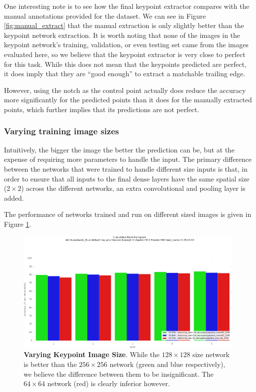 One interesting note is to see how the final keypoint extractor compares with the manual annotations provided for the dataset.
We can see in Figure \ref{fig:manual_extract} that the manual extraction is only slightly better than the keypoint network extraction.
It is worth noting that none of the images in the keypoint network's training, validation, or even testing set came from the images evaluated here, so we believe that the keypoint extractor is very close to perfect for this task.
While this does not mean that the keypoints predicted are perfect, it does imply that they are ``good enough'' to extract a matchable trailing edge.

However, using the notch as the control point actually does reduce the accuracy more significantly for the predicted points than it does for the manually extracted points, which further implies that its predictions are not perfect.

\subsubsection{Varying training image sizes}

Intuitively, the bigger the image the better the prediction can be, but at the expense of requiring more parameters to handle the input.
The primary difference between the networks that were trained to handle different size inputs is that, in order to ensure that all inputs to the final dense layers have the same spatial size ($2\times2$) across the different networks, an extra convolutional and pooling layer is added.

The performance of networks trained and run on different sized images is given in Figure \ref{fig:vary_kp_size}.

\begin{figure}[t]%
\centering
\includegraphics[width=1\textwidth]{../images/results/vary_kp_size.png}
\caption{\textbf{Varying Keypoint Image Size}. While the $128 \times 128$ size network is better than the $256 \times 256$ network (green and blue respectively), we believe the difference between them to be insignificant. The $64 \times 64$ network (red) is clearly inferior however. }
\label{fig:vary_kp_size}
\end{figure}


